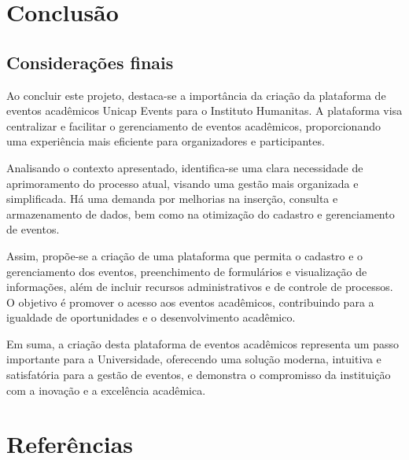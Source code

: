\chapter{Conclusão}

\section{Considerações finais}

Ao concluir este projeto, destaca-se a importância da criação da plataforma de eventos acadêmicos Unicap Events para o Instituto Humanitas. A plataforma visa centralizar e facilitar o gerenciamento de eventos acadêmicos, proporcionando uma experiência mais eficiente para organizadores e participantes.

Analisando o contexto apresentado, identifica-se uma clara necessidade de aprimoramento do processo atual, visando uma gestão mais organizada e simplificada. Há uma demanda por melhorias na inserção, consulta e armazenamento de dados, bem como na otimização do cadastro e gerenciamento de eventos.

Assim, propõe-se a criação de uma plataforma que permita o cadastro e o gerenciamento dos eventos, preenchimento de formulários e visualização de informações, além de incluir recursos administrativos e de controle de processos. O objetivo é promover o acesso aos eventos acadêmicos, contribuindo para a igualdade de oportunidades e o desenvolvimento acadêmico.

Em suma, a criação desta plataforma de eventos acadêmicos representa um passo importante para a Universidade, oferecendo uma solução moderna, intuitiva e satisfatória para a gestão de eventos, e demonstra o compromisso da instituição com a inovação e a excelência acadêmica.

\chapter{Referências}